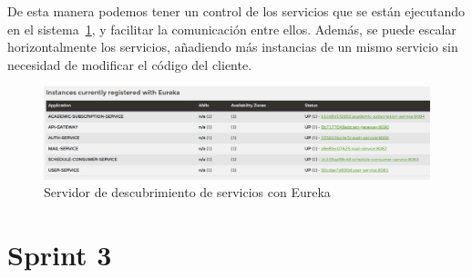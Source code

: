 De esta manera podemos tener un control de los servicios que se están ejecutando en el sistema~\ref{eureka}, y facilitar la comunicación entre ellos. Además, se puede escalar horizontalmente los servicios, añadiendo más instancias de un mismo servicio sin necesidad de modificar el código del cliente.

\begin{figure}[H]
    \centering
    \includegraphics[width=1\textwidth]{figures/07_eureka.png}
    \caption{Servidor de descubrimiento de servicios con Eureka}
    \label{eureka}
\end{figure}

\section{Sprint 3}

